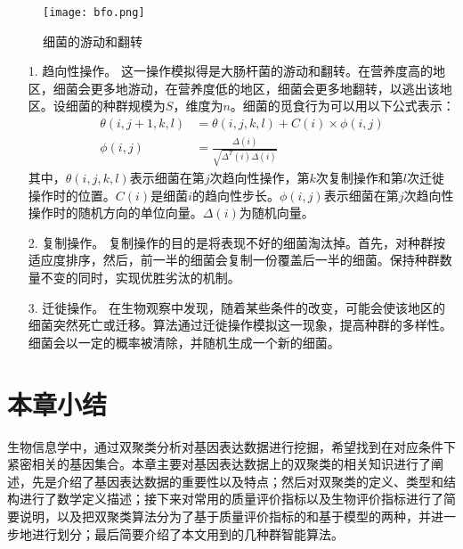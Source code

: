   \begin{figure}[htbp]
    \centering
    \texttt{[image: bfo.png]}
    \caption{细菌的游动和翻转}
    \label{fig:bfo}
  \end{figure}

  \begin{enumerate}
    \item[1.] 趋向性操作。 
    这一操作模拟得是大肠杆菌的游动和翻转。在营养度高的地区，细菌会更多地游动，在营养度低的地区，细菌会更多地翻转，以逃出该地区。设细菌的种群规模为$S$，维度为$n$。细菌的觅食行为可以用以下公式表示：
    \begin{align}
      \theta(i,j+1,k,l) &= \theta(i,j,k,l) + C(i) \times \phi(i,j) \\
      \phi(i,j) &= \frac{\Delta(i)}{\sqrt{\Delta^T(i)\Delta(i)}}
    \end{align}
    其中，$\theta(i,j,k,l)$表示细菌在第$j$次趋向性操作，第$k$次复制操作和第$l$次迁徙操作时的位置。$C(i)$是细菌$i$的趋向性步长。$\phi(i,j)$表示细菌在第$j$次趋向性操作时的随机方向的单位向量。$\Delta(i)$为随机向量。

    \item[2.] 复制操作。
    复制操作的目的是将表现不好的细菌淘汰掉。首先，对种群按适应度排序，然后，前一半的细菌会复制一份覆盖后一半的细菌。保持种群数量不变的同时，实现优胜劣汰的机制。

    \item[3.] 迁徙操作。
    在生物观察中发现，随着某些条件的改变，可能会使该地区的细菌突然死亡或迁移。算法通过迁徙操作模拟这一现象，提高种群的多样性。细菌会以一定的概率被清除，并随机生成一个新的细菌。
    
  \end{enumerate}

\section{本章小结}
生物信息学中，通过双聚类分析对基因表达数据进行挖掘，希望找到在对应条件下紧密相关的基因集合。本章主要对基因表达数据上的双聚类的相关知识进行了阐述，先是介绍了基因表达数据的重要性以及特点；然后对双聚类的定义、类型和结构进行了数学定义描述；接下来对常用的质量评价指标以及生物评价指标进行了简要说明，以及把双聚类算法分为了基于质量评价指标的和基于模型的两种，并进一步地进行划分；最后简要介绍了本文用到的几种群智能算法。